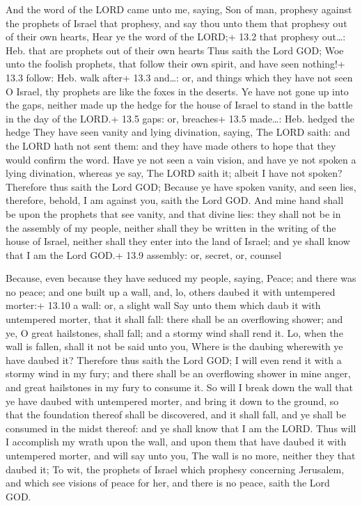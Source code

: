  And the word of the LORD came unto me, saying, 
Son of man, prophesy against the prophets of Israel that prophesy, and
say thou unto them that prophesy out of their own hearts, Hear ye the
word of the LORD;+ 13.2 that prophesy out\ldots: Heb. that are prophets
out of their own hearts  Thus saith the Lord GOD; Woe unto
the foolish prophets, that follow their own spirit, and have seen
nothing!+ 13.3 follow: Heb. walk after+ 13.3 and\ldots: or, and things
which they have not seen  O Israel, thy prophets are like
the foxes in the deserts.  Ye have not gone up into the
gaps, neither made up the hedge for the house of Israel to stand in the
battle in the day of the LORD.+ 13.5 gaps: or, breaches+ 13.5
made\ldots: Heb. hedged the hedge  They have seen vanity and
lying divination, saying, The LORD saith: and the LORD hath not sent
them: and they have made others to hope that they would confirm the
word.  Have ye not seen a vain vision, and have ye not
spoken a lying divination, whereas ye say, The LORD saith it; albeit I
have not spoken?  Therefore thus saith the Lord GOD; Because
ye have spoken vanity, and seen lies, therefore, behold, I am against
you, saith the Lord GOD.  And mine hand shall be upon the
prophets that see vanity, and that divine lies: they shall not be in the
assembly of my people, neither shall they be written in the writing of
the house of Israel, neither shall they enter into the land of Israel;
and ye shall know that I am the Lord GOD.+ 13.9 assembly: or, secret,
or, counsel

 Because, even because they have seduced my people,
saying, Peace; and there was no peace; and one built up a wall, and, lo,
others daubed it with untempered morter:+ 13.10 a wall: or, a slight
wall  Say unto them which daub it with untempered morter,
that it shall fall: there shall be an overflowing shower; and ye, O
great hailstones, shall fall; and a stormy wind shall rend it.
 Lo, when the wall is fallen, shall it not be said unto
you, Where is the daubing wherewith ye have daubed it? 
Therefore thus saith the Lord GOD; I will even rend it with a stormy
wind in my fury; and there shall be an overflowing shower in mine anger,
and great hailstones in my fury to consume it.  So will I
break down the wall that ye have daubed with untempered morter, and
bring it down to the ground, so that the foundation thereof shall be
discovered, and it shall fall, and ye shall be consumed in the midst
thereof: and ye shall know that I am the LORD.  Thus will I
accomplish my wrath upon the wall, and upon them that have daubed it
with untempered morter, and will say unto you, The wall is no more,
neither they that daubed it;  To wit, the prophets of
Israel which prophesy concerning Jerusalem, and which see visions of
peace for her, and there is no peace, saith the Lord GOD.

